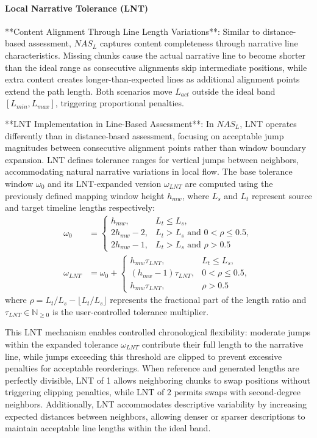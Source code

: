 \documentclass[main.tex]{subfiles}
\begin{document}
\paragraph{Local Narrative Tolerance (LNT)}
**Content Alignment Through Line Length Variations**: Similar to distance-based assessment, $NAS_L$ captures content completeness through narrative line characteristics. Missing chunks cause the actual narrative line to become shorter than the ideal range as consecutive alignments skip intermediate positions, while extra content creates longer-than-expected lines as additional alignment points extend the path length. Both scenarios move $L_{act}$ outside the ideal band $[L_{min}, L_{max}]$, triggering proportional penalties.

**LNT Implementation in Line-Based Assessment**: In $NAS_L$, LNT operates differently than in distance-based assessment, focusing on acceptable jump magnitudes between consecutive alignment points rather than window boundary expansion. LNT defines tolerance ranges for vertical jumps between neighbors, accommodating natural narrative variations in local flow. The base tolerance window $\omega_0$ and its LNT-expanded version $\omega_{LNT}$ are computed using the previously defined mapping window height $h_{mw}$, where $L_s$ and $L_t$ represent source and target timeline lengths respectively:
\begin{align}
\omega_0 &= \begin{cases}
h_{mw}, & L_t \leq L_s, \\
2h_{mw} - 2, & L_t > L_s \text{ and } 0 < \rho \leq 0.5, \\
2h_{mw} - 1, & L_t > L_s \text{ and } \rho > 0.5
\end{cases} \\
\omega_{LNT} &= \omega_0 + \begin{cases}
h_{mw} \tau_{LNT}, & L_t \leq L_s, \\
(h_{mw} - 1) \tau_{LNT}, & 0 < \rho \leq 0.5, \\
h_{mw} \tau_{LNT}, & \rho > 0.5
\end{cases}
\end{align}
where $\rho = L_t/L_s - \lfloor L_t/L_s \rfloor$ represents the fractional part of the length ratio and $\tau_{LNT} \in \mathbb{N}_{\geq 0}$ is the user-controlled tolerance multiplier.

This LNT mechanism enables controlled chronological flexibility: moderate jumps within the expanded tolerance $\omega_{LNT}$ contribute their full length to the narrative line, while jumps exceeding this threshold are clipped to prevent excessive penalties for acceptable reorderings. When reference and generated lengths are perfectly divisible, LNT of 1 allows neighboring chunks to swap positions without triggering clipping penalties, while LNT of 2 permits swaps with second-degree neighbors. Additionally, LNT accommodates descriptive variability by increasing expected distances between neighbors, allowing denser or sparser descriptions to maintain acceptable line lengths within the ideal band.
\end{document}
